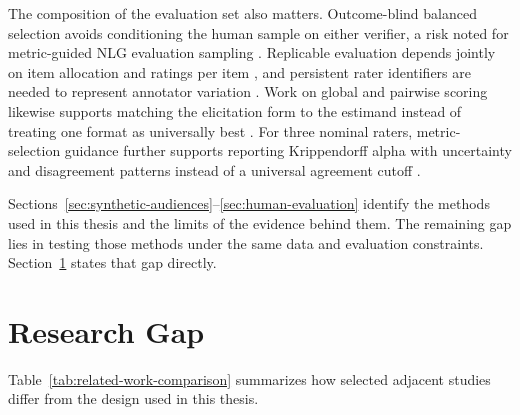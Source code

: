 The composition of the evaluation set also matters. Outcome-blind balanced selection avoids conditioning the human sample on either verifier, a risk noted for metric-guided NLG evaluation sampling \cite{b33}. Replicable evaluation depends jointly on item allocation and ratings per item \cite{b34}, and persistent rater identifiers are needed to represent annotator variation \cite{b35}. Work on global and pairwise scoring likewise supports matching the elicitation form to the estimand instead of treating one format as universally best \cite{b36}. For three nominal raters, metric-selection guidance further supports reporting Krippendorff alpha with uncertainty and disagreement patterns instead of a universal agreement cutoff \cite{b37}.

Sections~\ref{sec:synthetic-audiences}--\ref{sec:human-evaluation} identify the methods used in this thesis and the limits of the evidence behind them. The remaining gap lies in testing those methods under the same data and evaluation constraints. Section~\ref{sec:research-gap} states that gap directly.

\section{Research Gap}
\label{sec:research-gap}

Table~\ref{tab:related-work-comparison} summarizes how selected adjacent studies differ from the design used in this thesis.

